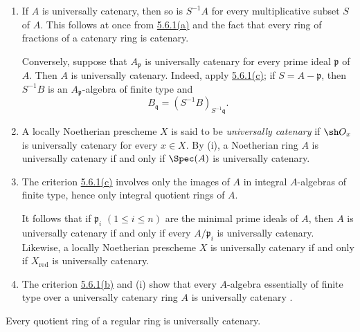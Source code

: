 \begin{remarks}[5.6.3]
\label{IV.5.6.3}
\begin{enumerate}[{\rm(i)}]
\item
{}
\label{IV.5.6.3.i}
If $A$ is universally catenary, then so is $S^{-1}A$ for every
multiplicative subset $S$ of $A$.  This follows at once from
{\hyperref[IV.5.6.1.a]{5.6.1\textup{(a)}}} and the fact that every ring
of fractions of a
catenary ring is catenary.

Conversely, suppose that $A_{\mathfrak p}$ is universally catenary
for every prime ideal $\mathfrak p$ of $A$.  Then $A$ is universally
catenary.  Indeed, apply
{\hyperref[IV.5.6.1.c]{5.6.1\textup{(c)}}}; if
$S=A-\mathfrak p$, then $S^{-1}B$ is an
$A_{\mathfrak p}$-algebra of finite type and
\[
B_{\mathfrak q}=(S^{-1}B)_{S^{-1}\mathfrak q}.
\]

\item
{}
\label{IV.5.6.3.ii}
A locally Noetherian prescheme $X$ is said to be
\emph{universally catenary} if $\sh O_x$ is universally catenary for
every $x\in X$.  By (i), a Noetherian ring $A$ is universally
catenary if and only if $\Spec(A)$ is universally catenary.

\item
{}
\label{IV.5.6.3.iii}
The criterion {\hyperref[IV.5.6.1.c]{5.6.1\textup{(c)}}} involves only
the images of $A$ in
integral $A$-algebras of finite type, hence only integral quotient
rings of $A$.


It follows that if
$\mathfrak p_i$ $(1\leq i\leq n)$ are the minimal prime ideals of
$A$, then $A$ is universally catenary if and only if every
$A/\mathfrak p_i$ is universally catenary.  Likewise, a locally
Noetherian prescheme $X$ is universally catenary if and only if
$X_{\mathrm{red}}$ is universally catenary.

\item
{}
\label{IV.5.6.3.iv}
The criterion {\hyperref[IV.5.6.1.b]{5.6.1\textup{(b)}}} and (i) show
that every $A$-algebra
essentially of finite type over a universally catenary ring $A$ is
universally catenary .
\end{enumerate}
\end{remarks}

\begin{proposition}[5.6.4]
\label{IV.5.6.4}
Every quotient ring of a regular ring is universally catenary.
\end{proposition}

